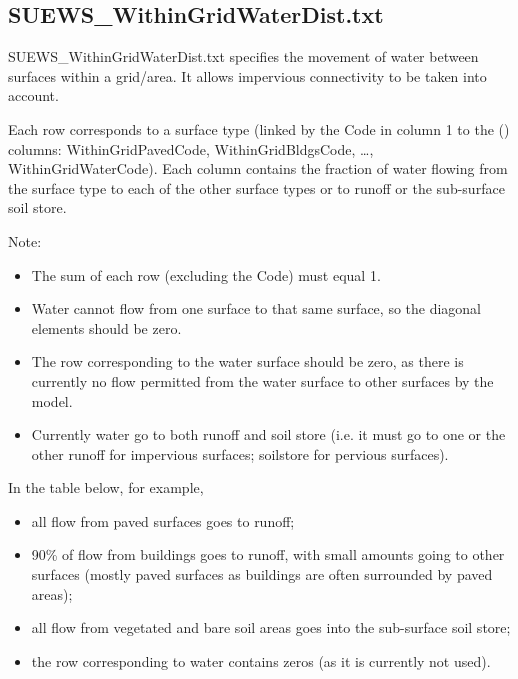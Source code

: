 \documentclass[letterpaper,10pt,english]{sphinxmanual}
\begin{document}
\subsection{SUEWS\_WithinGridWaterDist.txt}
\label{\detokenize{input_files/SUEWS_SiteInfo/SUEWS_WithinGridWaterDist:suews-withingridwaterdist-txt}}\label{\detokenize{input_files/SUEWS_SiteInfo/SUEWS_WithinGridWaterDist::doc}}\label{\detokenize{input_files/SUEWS_SiteInfo/SUEWS_WithinGridWaterDist:id1}}
SUEWS\_WithinGridWaterDist.txt specifies the movement of water between
surfaces within a grid/area. It allows impervious connectivity to be
taken into account.

Each row corresponds to a surface type (linked by the Code in column 1
to the {\hyperref[\detokenize{input_files/SUEWS_SiteInfo/SUEWS_SiteSelect:suews-siteselect-txt}]{}} () columns:
WithinGridPavedCode, WithinGridBldgsCode, …, WithinGridWaterCode). Each
column contains the fraction of water flowing from the surface type to
each of the other surface types or to runoff or the sub-surface soil
store.

Note:
\begin{itemize}
\item {} 
The sum of each row (excluding the Code) must equal 1.

\item {} 
Water cannot flow from one surface to that same surface, so the
diagonal elements should be zero.

\item {} 
The row corresponding to the water surface should be zero, as there
is currently no flow permitted from the water surface to other
surfaces by the model.

\item {} 
Currently water  go to both runoff and soil store (i.e. it
must go to one or the other \textendash{} runoff for impervious surfaces;
soilstore for pervious surfaces).

\end{itemize}

In the table below, for example,
\begin{itemize}
\item {} 
all flow from paved surfaces goes to runoff;

\item {} 
90\% of flow from buildings goes to runoff, with small amounts going
to other surfaces (mostly paved surfaces as buildings are often
surrounded by paved areas);

\item {} 
all flow from vegetated and bare soil areas goes into the sub-surface
soil store;

\item {} 
the row corresponding to water contains zeros (as it is currently not
used).

\end{itemize}
\end{document}

